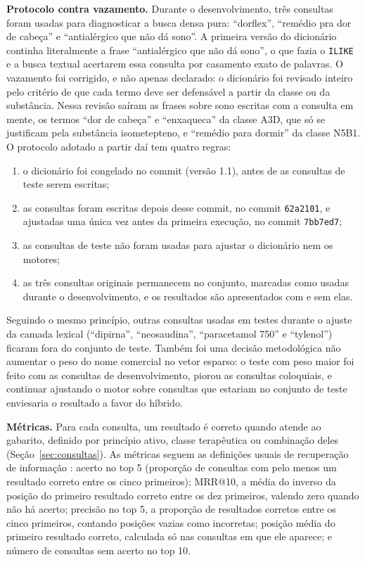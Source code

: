 \documentclass[12pt,oneside,a4paper,english,brazil]{abntex2}
\newcommand{\campo}[1]{\texttt{#1}}
\begin{document}
\textbf{Protocolo contra vazamento.} Durante o desenvolvimento, três consultas foram usadas para diagnosticar a busca densa pura: ``dorflex'', ``remédio pra dor de cabeça'' e ``antialérgico que não dá sono''. A primeira versão do dicionário continha literalmente a frase ``antialérgico que não dá sono'', o que fazia o \campo{ILIKE} e a busca textual acertarem essa consulta por casamento exato de palavras. O vazamento foi corrigido, e não apenas declarado: o dicionário foi revisado inteiro pelo critério de que cada termo deve ser defensável a partir da classe ou da substância. Nessa revisão saíram as frases sobre sono escritas com a consulta em mente, os termos ``dor de cabeça'' e ``enxaqueca'' da classe A3D, que só se justificam pela substância isometepteno, e ``remédio para dormir'' da classe N5B1. O protocolo adotado a partir daí tem quatro regras:
\begin{enumerate}
  \item o dicionário foi congelado no commit \texttt{} (versão 1.1), antes de as consultas de teste serem escritas;
  \item as consultas foram escritas depois desse commit, no commit \campo{62a2101}, e ajustadas uma única vez antes da primeira execução, no commit \campo{7bb7ed7};
  \item as consultas de teste não foram usadas para ajustar o dicionário nem os motores;
  \item as três consultas originais permanecem no conjunto, marcadas como usadas durante o desenvolvimento, e os resultados são apresentados com e sem elas.
\end{enumerate}
Seguindo o mesmo princípio, outras consultas usadas em testes durante o ajuste da camada lexical (``dipirna'', ``neosaudina'', ``paracetamol 750'' e ``tylenol'') ficaram fora do conjunto de teste. Também foi uma decisão metodológica não aumentar o peso do nome comercial no vetor esparso: o teste com peso maior foi feito com as consultas de desenvolvimento, piorou as consultas coloquiais, e continuar ajustando o motor sobre consultas que estariam no conjunto de teste enviesaria o resultado a favor do híbrido.

\textbf{Métricas.} Para cada consulta, um resultado é correto quando atende ao gabarito, definido por princípio ativo, classe terapêutica ou combinação deles (Seção~\ref{sec:consultas}). As métricas seguem as definições usuais de recuperação de informação \cite{manning2008}: acerto no top 5 (proporção de consultas com pelo menos um resultado correto entre os cinco primeiros); MRR@10, a média do inverso da posição do primeiro resultado correto entre os dez primeiros, valendo zero quando não há acerto; precisão no top 5, a proporção de resultados corretos entre os cinco primeiros, contando posições vazias como incorretas; posição média do primeiro resultado correto, calculada só nas consultas em que ele aparece; e número de consultas sem acerto no top 10.
\end{document}
